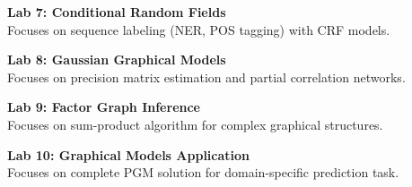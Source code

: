 \noindent\textbf{Lab 7: Conditional Random Fields} \\
Focuses on sequence labeling (NER, POS tagging) with CRF models.

\vspace{0.2cm}

\noindent\textbf{Lab 8: Gaussian Graphical Models} \\
Focuses on precision matrix estimation and partial correlation networks.

\vspace{0.2cm}

\noindent\textbf{Lab 9: Factor Graph Inference} \\
Focuses on sum-product algorithm for complex graphical structures.

\vspace{0.2cm}

\noindent\textbf{Lab 10: Graphical Models Application} \\
Focuses on complete PGM solution for domain-specific prediction task.

\vspace{0.2cm}

\newpage
{}
